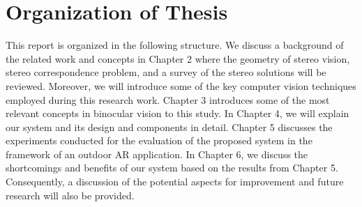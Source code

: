 \section{Organization of Thesis}
This report is organized in the following structure.
We discuss a background of the related work and concepts in Chapter 2 where the geometry of stereo vision, 
stereo correspondence problem, and a survey of the stereo solutions will be reviewed. 
Moreover, we will introduce some of the key computer vision techniques employed
during this research work. Chapter 3 introduces some of the most relevant concepts in binocular vision to this study.
In Chapter 4, we will explain our system and its design and components in detail. Chapter 5 discusses the experiments
conducted for the evaluation of the proposed system in the framework of an outdoor AR application.
In Chapter 6, we discuss the shortcomings and benefits of our system based on the results from Chapter 5. 
Consequently, a discussion of the potential aspects for improvement 
and future research will also be provided.

